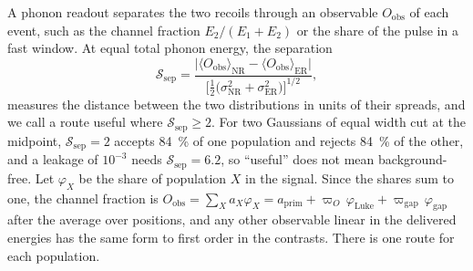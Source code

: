 A phonon readout separates the two recoils through an observable $O_{\mathrm{obs}}$ of each event, such as the channel fraction $E_2/(E_1 + E_2)$ or the share of the pulse in a fast window. At equal total phonon energy, the separation
\begin{equation}
  \mathcal{S}_{\mathrm{sep}} = \frac{\bigl|\langle O_{\mathrm{obs}}\rangle_{\mathrm{NR}} - \langle O_{\mathrm{obs}}\rangle_{\mathrm{ER}}\bigr|}{\bigl[\tfrac12\bigl(\sigma_{\mathrm{NR}}^2 + \sigma_{\mathrm{ER}}^2\bigr)\bigr]^{1/2}} ,
  \label{eq:20.5-sep}
\end{equation}
measures the distance between the two distributions in units of their spreads, and we call a route useful where $\mathcal{S}_{\mathrm{sep}} \ge 2$. For two Gaussians of equal width cut at the midpoint, $\mathcal{S}_{\mathrm{sep}} = 2$ accepts \SI{84}{\percent} of one population and rejects \SI{84}{\percent} of the other, and a leakage of $10^{-3}$ needs $\mathcal{S}_{\mathrm{sep}} = 6.2$, so ``useful'' does not mean background-free. Let $\varphi_X$ be the share of population $X$ in the signal. Since the shares sum to one, the channel fraction is $O_{\mathrm{obs}} = \sum_Xa_X\varphi_X = a_{\mathrm{prim}} + \varpi_O\,\varphi_{\mathrm{Luke}} + \varpi_{\mathrm{gap}}\,\varphi_{\mathrm{gap}}$ after the average over positions, and any other observable linear in the delivered energies has the same form to first order in the contrasts. There is one route for each population.

